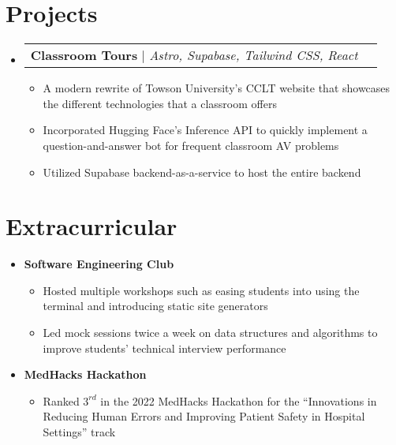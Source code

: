 \documentclass[letterpaper,11pt]{article}
\makeatletter
\newcommand{\resumeItem}[1]{
  \item\small{
    {#1 \vspace{-2pt}}
  }
}
\newcommand{\resumeProjectHeading}[2]{
    \vspace{-2pt}\item
    \begin{tabular*}{0.97\textwidth}{l@{\extracolsep{\fill}}r}
      \small#1 & #2 \\
    \end{tabular*}\vspace{-7pt}
}
\newcommand{\resumeSubHeadingListStart}{\begin{itemize}[leftmargin=0.15in, label={}]}
\newcommand{\resumeSubHeadingListEnd}{\end{itemize}}
\newcommand{\resumeItemListStart}{\begin{itemize}}
\newcommand{\resumeItemListEnd}{\end{itemize}\vspace{-5pt}}
\makeatother
\begin{document}

\section{Projects}
\vspace{3pt}
\resumeSubHeadingListStart

\resumeProjectHeading
{\textbf{Classroom Tours} $|$ \emph{Astro, Supabase, Tailwind CSS, React}}{}
\resumeItemListStart
\resumeItem{A modern rewrite of Towson University's CCLT website that showcases the different technologies that a classroom offers}
\resumeItem{Incorporated Hugging Face's Inference API to quickly implement a question-and-answer bot for frequent classroom AV problems}
\resumeItem{Utilized Supabase backend-as-a-service to host the entire backend}

\resumeItemListEnd

\resumeSubHeadingListEnd





\section{Extracurricular}
\vspace{2pt}
\resumeSubHeadingListStart
\resumeItem{\textbf{Software Engineering Club}}
\resumeItemListStart
\resumeItem{Hosted multiple workshops such as easing students into using the terminal and introducing static site generators}
\resumeItem{Led mock sessions twice a week on data structures and algorithms to improve students’ technical interview performance}
\resumeItemListEnd
\resumeItem{\textbf{MedHacks Hackathon}}
\resumeItemListStart
\resumeItem{Ranked \(3^{rd}\) in the 2022 MedHacks Hackathon for the ``Innovations in Reducing Human Errors and Improving Patient Safety in Hospital Settings'' track}
\resumeItemListEnd
\resumeSubHeadingListEnd





\end{document}
